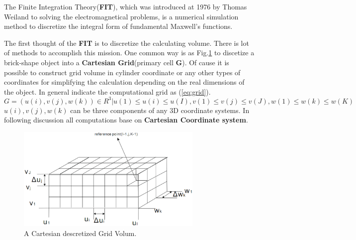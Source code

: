 The Finite Integration Theory(\textbf{FIT}), which was introduced at 1976 by Thomas Weiland\cite{FIT_discrete_method} to solving the electromagnetical problems, is a numerical simulation method to discretize the integral form of fundamental Maxwell's functions.

The first thought of the \textbf{FIT} is to discretize the calculating volume. There is lot of methods to accomplish this mission. One common way is as Fig.\ref{fig:discretization_material} to discetize a brick-shape object into a \textbf{Cartesian Grid}(primary cell \textbf{G}). Of cause it is possible to construct grid volume in cylinder coordinate or any other types of  coordinates\cite{FIT_triangular_discretization,FDTD_nonorthogonal_grids} for simplifying the calculation depending on the real dimensions of the object. In general \cite{script_FeldSim} indicate the computational grid as (\ref{eq:grid}).
\begin{equation}
G={(u(i),v(j),w(k))\in R^3|u(1)\leq u(i)\leq u(I),
													 v(1)\leq v(j)\leq v(J),
													 w(1)\leq w(k)\leq w(K)
}
\label{eq:grid}
\end{equation}
$u(i),v(j),w(k)$ can be three components of any 3D coordinate systems. In following discussion all computations base on \textbf{Cartesian Coordinate system}.
\begin{figure}[!ht]
\centering
\includegraphics[width=0.8\textwidth]{bilder/grid_volum}
\caption{A Cartesian descretized Grid Volum.}
\label{fig:discretization_material}
\end{figure}


